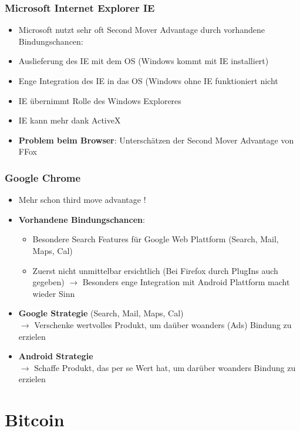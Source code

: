 \documentclass{article} %
\begin{document}
		\subsubsection{Microsoft Internet Explorer IE}
		\begin{itemize}
			\item Microsoft nutzt sehr oft Second Mover Advantage durch vorhandene Bindungschancen:
			\item Auslieferung des IE mit dem OS (Windows kommt mit IE installiert)
			\item Enge Integration des IE in das OS (Windows ohne IE funktioniert nicht
			\item IE übernimmt Rolle des Windows Exploreres
			\item IE kann mehr dank ActiveX
			\item \textbf{Problem beim Browser}: Unterschätzen der Second Mover Advantage von FFox
		\end{itemize}
		\subsubsection{Google Chrome}
		\begin{itemize}
			\item Mehr schon third move advantage !
			\item \textbf{Vorhandene Bindungschancen}:
			\begin{itemize}
				\item Besondere Search Features für Google Web Plattform (Search, Mail, Maps, Cal)
				\item Zuerst nicht unmittelbar ersichtlich (Bei Firefox durch PlugIns auch gegeben) $\rightarrow$ Besonders enge Integration mit Android Plattform macht wieder Sinn
			\end{itemize}
			\item \textbf{Google Strategie} (Search, Mail, Maps, Cal)\\
				$\rightarrow$ Verschenke wertvolles Produkt, um daüber woanders (Ads) Bindung zu erzielen
				\item \textbf{Android Strategie}\\
				$\rightarrow$ Schaffe Produkt, das per se Wert hat, um darüber woanders Bindung zu erzielen
		\end{itemize}
		
		
	\section{Bitcoin}
\end{document}
